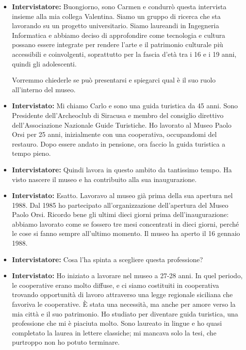 \documentclass{article}
\begin{document}
\begin{itemize}
    \item \textbf{Intervistatore:} Buongiorno, sono Carmen e condurrò questa intervista insieme alla mia collega Valentina. Siamo un gruppo di ricerca che sta lavorando su un progetto universitario. Siamo laureandi in Ingegneria Informatica e abbiamo deciso di approfondire come tecnologia e cultura possano essere integrate per rendere l'arte e il patrimonio culturale più accessibili e coinvolgenti, soprattutto per la fascia d'età tra i 16 e i 19 anni, quindi gli adolescenti.
    
    Vorremmo chiederle se può presentarsi e spiegarci qual è il suo ruolo all’interno del museo.
    
    \item \textbf{Intervistato:} Mi chiamo Carlo e sono una guida turistica da 45 anni. Sono Presidente dell’Archeoclub di Siracusa e membro del consiglio direttivo dell’Associazione Nazionale Guide Turistiche. Ho lavorato al Museo Paolo Orsi per 25 anni, inizialmente con una cooperativa, occupandomi del restauro. Dopo essere andato in pensione, ora faccio la guida turistica a tempo pieno.
    
    \item \textbf{Intervistatore:} Quindi lavora in questo ambito da tantissimo tempo. Ha visto nascere il museo e ha contribuito alla sua inaugurazione.
    
    \item \textbf{Intervistato:} Esatto. Lavoravo al museo già prima della sua apertura nel 1988. Dal 1985 ho partecipato all’organizzazione dell’apertura del Museo Paolo Orsi. Ricordo bene gli ultimi dieci giorni prima dell’inaugurazione: abbiamo lavorato come se fossero tre mesi concentrati in dieci giorni, perché le cose si fanno sempre all’ultimo momento. Il museo ha aperto il 16 gennaio 1988.
    
    \item \textbf{Intervistatore:} Cosa l’ha spinta a scegliere questa professione?
    
    \item \textbf{Intervistato:} Ho iniziato a lavorare nel museo a 27-28 anni. In quel periodo, le cooperative erano molto diffuse, e ci siamo costituiti in cooperativa trovando opportunità di lavoro attraverso una legge regionale siciliana che favoriva le cooperative. È stata una necessità, ma anche per amore verso la mia città e il suo patrimonio. Ho studiato per diventare guida turistica, una professione che mi è piaciuta molto. Sono laureato in lingue e ho quasi completato la laurea in lettere classiche; mi mancava solo la tesi, che purtroppo non ho potuto terminare.
    

\end{itemize}
\end{document}
